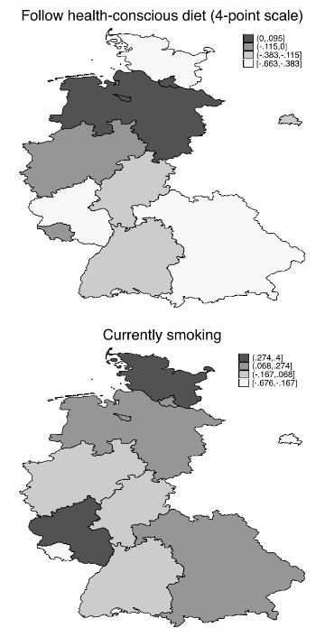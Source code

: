 \documentclass[a4paper ]{article}
\begin{document}
\newpage
\begin{figure}[p]\centering
\begin{subfigure}[h]{0.4\textwidth}\centering
	\includegraphics[width=\textwidth]{../../analysis/graphs/SOEP/LOCHealthydiet.pdf}
\end{subfigure}
\quad
\begin{subfigure}[h]{0.4\textwidth}\centering
	\includegraphics[width=\textwidth]{../../analysis/graphs/SOEP/LOCD_smoke.pdf}

\end{subfigure}
\end{figure}
\end{document}
